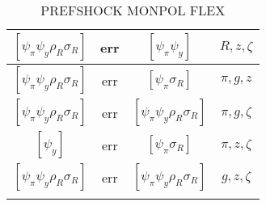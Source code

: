 \documentclass[a4paper,10pt]{article}
\begin{document}
\begin{longtable}{|c|c|c|c|}
\hline
$[\psi_\pi \psi_y \rho_R \sigma_R ]$ & err & $[\psi_\pi \psi_y ]$ & ${R},{z},{\zeta}$ \\
\hline
$[\psi_\pi \psi_y \rho_R \sigma_R ]$ & err & $[\psi_\pi \sigma_R ]$ & ${\pi},{g},{z}$ \\
\hline
$[\psi_\pi \psi_y \rho_R \sigma_R ]$ & err & $[\psi_\pi \psi_y \rho_R \sigma_R ]$ & ${\pi},{g},{\zeta}$ \\
\hline
$[\psi_y ]$ & err & $[\psi_\pi \sigma_R ]$ & ${\pi},{z},{\zeta}$ \\
\hline
$[\psi_\pi \psi_y \rho_R \sigma_R ]$ & err & $[\psi_\pi \psi_y \rho_R \sigma_R ]$ & ${g},{z},{\zeta}$ \\
\hline
\caption{PREFSHOCK MONPOL FLEX}
\label{table:MyTableLabel}
\end{longtable}
\end{document}
